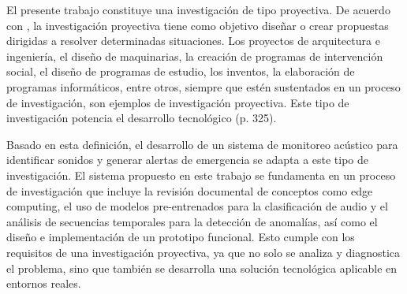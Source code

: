 
El presente trabajo constituye una investigación de tipo proyectiva. De acuerdo con \citeauthor{hurtado_metodologia_2000} \citeyear{hurtado_metodologia_2000}, la investigación proyectiva tiene como objetivo diseñar o crear propuestas dirigidas a resolver determinadas situaciones. Los proyectos de arquitectura e ingeniería, el diseño de maquinarias, la creación de programas de intervención social, el diseño de programas de estudio, los inventos, la elaboración de programas informáticos, entre otros, siempre que estén sustentados en un proceso de investigación, son ejemplos de investigación proyectiva. Este tipo de investigación potencia el desarrollo tecnológico (p. 325).

Basado en esta definición, el desarrollo de un sistema de monitoreo acústico para identificar sonidos y generar alertas de emergencia se adapta a este tipo de investigación. El sistema propuesto en este trabajo se fundamenta en un proceso de investigación que incluye la revisión documental de conceptos como edge computing, el uso de modelos pre-entrenados para la clasificación de audio y el análisis de secuencias temporales para la detección de anomalías, así como el diseño e implementación de un prototipo funcional. Esto cumple con los requisitos de una investigación proyectiva, ya que no solo se analiza y diagnostica el problema, sino que también se desarrolla una solución tecnológica aplicable en entornos reales.

